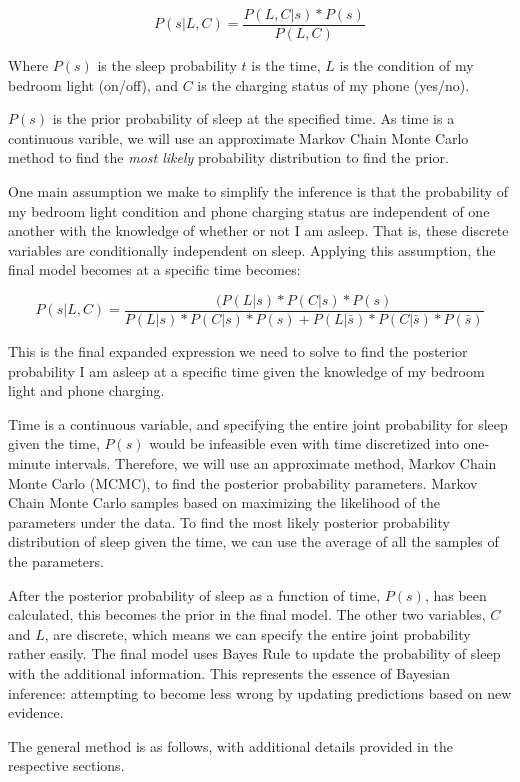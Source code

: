 \documentclass[12pt]{article}
\begin{document}
\[P(s|L, C) = \frac{P(L, C|s) * P (s)}{P(L, C)}\]

Where \(P(s)\) is the sleep probability \(t\) is the time, \(L\) is the
condition of my bedroom light (on/off), and \(C\) is the charging status
of my phone (yes/no).

\(P(s)\) is the prior probability of sleep at the specified time. As
time is a continuous varible, we will use an approximate Markov Chain
Monte Carlo method to find the \emph{most likely} probability
distribution to find the prior.

One main assumption we make to simplify the inference is that the
probability of my bedroom light condition and phone charging status are
independent of one another with the knowledge of whether or not I am
asleep. That is, these discrete variables are conditionally independent
on sleep. Applying this assumption, the final model becomes at a
specific time becomes:

\[P(s | L, C) = \frac{(P(L|s) * P(C|s) * P(s)}{P(L|s) * P(C|s) * P(s) + P(L|\bar{s}) * P(C|\bar{s}) * P(\bar{s})}\]

This is the final expanded expression we need to solve to find the
posterior probability I am asleep at a specific time given the knowledge
of my bedroom light and phone charging.

Time is a continuous variable, and specifying the entire joint
probability for sleep given the time, \(P(s)\) would be infeasible even
with time discretized into one-minute intervals. Therefore, we will use
an approximate method, Markov Chain Monte Carlo (MCMC), to find the
posterior probability parameters. Markov Chain Monte Carlo samples based
on maximizing the likelihood of the parameters under the data. To find
the most likely posterior probability distribution of sleep given the
time, we can use the average of all the samples of the parameters.

After the posterior probability of sleep as a function of time,
\(P(s)\), has been calculated, this becomes the prior in the final
model. The other two variables, \(C\) and \(L\), are discrete, which
means we can specify the entire joint probability rather easily. The
final model uses Bayes Rule to update the probability of sleep with the
additional information. This represents the essence of Bayesian
inference: attempting to become less wrong by updating predictions based
on new evidence.

The general method is as follows, with additional details provided in
the respective sections.
\end{document}

